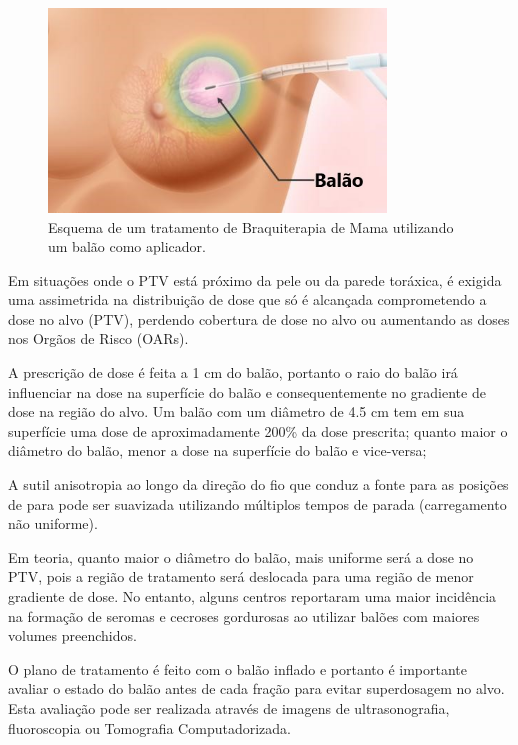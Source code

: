 \documentclass[11pt,a4paper]{article}
\begin{document}
			\begin{figure}[h]
				\centering
				\includegraphics[width=0.8\textwidth]{Imagens/esquemaBalaoMama.jpg}
				\caption{Esquema de um tratamento de Braquiterapia de Mama utilizando um balão como aplicador.}
				\label{img:esquemaBalao}
			\end{figure}


			Em situações onde o PTV está próximo da pele ou da parede toráxica, é exigida uma assimetrida na distribuição de dose que só é alcançada comprometendo a dose no alvo (PTV), perdendo cobertura de dose no alvo ou aumentando as doses nos Orgãos de Risco (OARs).


			A prescrição de dose é feita a 1 cm do balão, portanto o raio do balão irá influenciar na dose na superfície do balão e consequentemente no gradiente de dose na região do alvo. Um balão com um diâmetro de 4.5 cm tem em sua superfície uma dose de aproximadamente 200\% da dose prescrita; quanto maior o diâmetro do balão, menor a dose na superfície do balão e vice-versa;

			A sutil anisotropia ao longo da direção do fio que conduz a fonte para as posições de para pode ser suavizada utilizando múltiplos tempos de parada (carregamento não uniforme). 

			Em teoria, quanto maior o diâmetro do balão, mais uniforme será a dose no PTV, pois a região de tratamento será deslocada para uma região de menor gradiente de dose. No entanto, alguns centros reportaram uma maior incidência na formação de seromas e cecroses gordurosas ao utilizar balões com maiores volumes preenchidos.

			O plano de tratamento é feito com o balão inflado e portanto é importante avaliar o estado do balão antes de cada fração para evitar superdosagem no alvo. Esta avaliação pode ser realizada através de imagens de ultrasonografia, fluoroscopia ou Tomografia Computadorizada.
\end{document}
